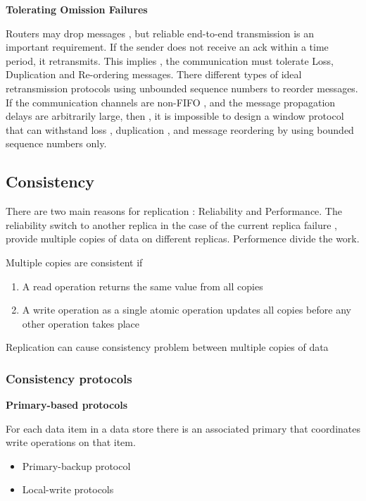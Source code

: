 \documentclass{article}
\begin{document}
\vspace{3mm}
\textbf{Tolerating Omission Failures}

Routers may drop messages , but reliable end-to-end transmission is an important requirement. 
If the sender does not receive an ack within a time period, it retransmits. This implies , the communication must tolerate Loss, Duplication and Re-ordering messages. 
There different types of ideal retransmission protocols using unbounded sequence numbers to reorder messages. If the communication channels are non-FIFO , and the message propagation delays are arbitrarily large, then , it is impossible to design a window protocol that can withstand loss , duplication , and message reordering by using bounded sequence numbers only.

\subsection{Consistency}

There are two main reasons for replication : Reliability and Performance.
The reliability switch to another replica in the case of the current replica failure , provide multiple copies of data on different replicas. Performence divide the work.

Multiple copies are consistent if \begin{enumerate}
    \item A read operation returns the same value from all copies
    \item A write operation as a single atomic operation updates all copies before any other operation takes place
\end{enumerate}

Replication can cause consistency problem between multiple copies of data


\subsubsection{Consistency protocols}

\vspace{3mm}
\textbf{Primary-based protocols}

For each data item in a data store there is an associated primary that coordinates write operations on that item.

\begin{itemize}
    \item Primary-backup protocol 
    \item Local-write protocols 
\end{itemize}
\end{document}
